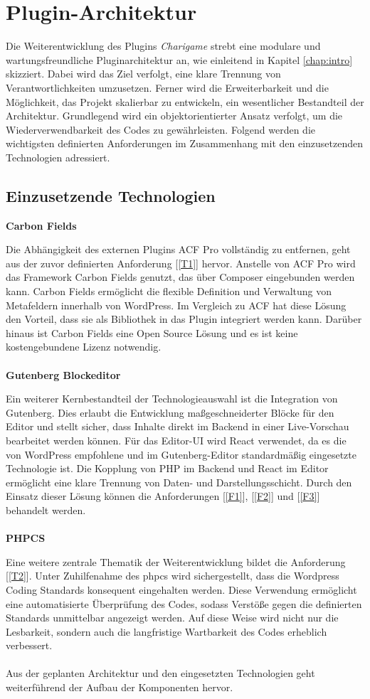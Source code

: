 \section{Plugin-Architektur}
Die Weiterentwicklung des Plugins \emph{Charigame} strebt eine modulare und wartungsfreundliche Pluginarchitektur an, wie einleitend in Kapitel \ref{chap:intro} skizziert.
Dabei wird das Ziel verfolgt, eine klare Trennung von Verantwortlichkeiten umzusetzen.
Ferner wird die Erweiterbarkeit und die Möglichkeit, das Projekt skalierbar zu entwickeln, ein wesentlicher Bestandteil der Architektur.
Grundlegend wird ein objektorientierter Ansatz verfolgt, um die Wiederverwendbarkeit des Codes zu gewährleisten.
Folgend werden die wichtigsten definierten Anforderungen im Zusammenhang mit den einzusetzenden Technologien adressiert.
\subsection{Einzusetzende Technologien}
\textbf{Carbon Fields}

Die Abhängigkeit des externen Plugins ACF Pro vollständig zu entfernen, geht aus der zuvor definierten Anforderung [\ref{T1}] hervor.
Anstelle von ACF Pro wird das Framework Carbon Fields genutzt, das über Composer eingebunden werden kann.
Carbon Fields ermöglicht die flexible Definition und Verwaltung von Metafeldern innerhalb von WordPress.
Im Vergleich zu ACF hat diese Lösung den Vorteil, dass sie als Bibliothek in das Plugin integriert werden kann.
Darüber hinaus ist Carbon Fields eine Open Source Lösung und es ist keine kostengebundene Lizenz notwendig.
\\\\
\textbf{Gutenberg Blockeditor}

Ein weiterer Kernbestandteil der Technologieauswahl ist die Integration von Gutenberg.
Dies erlaubt die Entwicklung maßgeschneiderter Blöcke für den Editor und stellt sicher, dass Inhalte direkt im Backend in einer Live-Vorschau bearbeitet werden können.
Für das Editor-UI wird React verwendet, da es die von WordPress empfohlene und im Gutenberg-Editor standardmäßig eingesetzte Technologie ist.
Die Kopplung von PHP im Backend und React im Editor ermöglicht eine klare Trennung von Daten- und Darstellungsschicht.
Durch den Einsatz dieser Lösung können die Anforderungen [\ref{F1}], [\ref{F2}] und [\ref{F3}] behandelt werden.
\\\\
\textbf{PHPCS}

Eine weitere zentrale Thematik der Weiterentwicklung bildet die Anforderung [\ref{T2}].
Unter Zuhilfenahme des \gls{phpcs} wird sichergestellt, dass die Wordpress Coding Standards konsequent eingehalten werden.
Diese Verwendung ermöglicht eine automatisierte Überprüfung des Codes, sodass Verstöße gegen die definierten Standards unmittelbar angezeigt werden.
Auf diese Weise wird nicht nur die Lesbarkeit, sondern auch die langfristige Wartbarkeit des Codes erheblich verbessert.
\\\\
Aus der geplanten Architektur und den eingesetzten Technologien geht weiterführend der Aufbau der Komponenten hervor.

